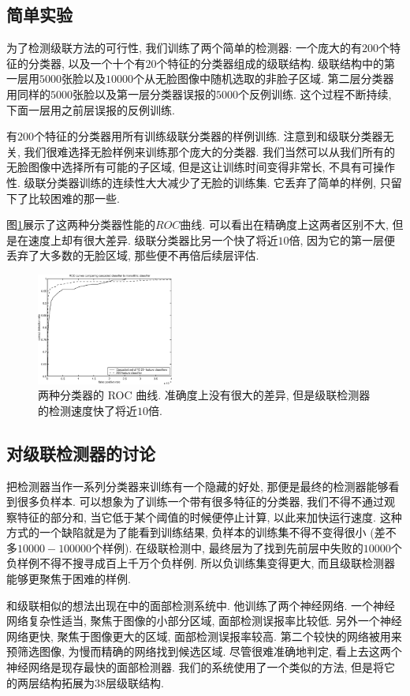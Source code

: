 \documentclass[a4paper,utf8,11pt, onecolumn]{ctexart}
\begin{document}
\subsection{简单实验}
为了检测级联方法的可行性, 我们训练了两个简单的检测器: 一个庞大的有$200$个特征的分类器, 以及一个十个有$20$个特征的分类器组成的级联结构. 级联结构中的第一层用$5000$张脸以及$10000$个从无脸图像中随机选取的非脸子区域.
第二层分类器用同样的$5000$张脸以及第一层分类器误报的$5000$个反例训练. 这个过程不断持续, 下面一层用之前层误报的反例训练.

有$200$个特征的分类器用所有训练级联分类器的样例训练. 注意到和级联分类器无关, 我们很难选择无脸样例来训练那个庞大的分类器. 我们当然可以从我们所有的无脸图像中选择所有可能的子区域, 但是这让训练时间变得非常长, 不具有可操作性. 级联分类器训练的连续性大大减少了无脸的训练集. 它丢弃了简单的样例, 只留下了比较困难的那一些.

图\ref{fig:comp}展示了这两种分类器性能的$ROC$曲线. 可以看出在精确度上这两者区别不大, 但是在速度上却有很大差异. 级联分类器比另一个快了将近$10$倍, 因为它的第一层便丢弃了大多数的无脸区域, 那些便不再倍后续层评估.
\begin{figure}
\centering
\includegraphics[width=0.4\textwidth]{ROC.png}
\caption{两种分类器的 ROC 曲线. 准确度上没有很大的差异, 但是级联检测器的检测速度快了将近$10$倍.}
\label{fig:comp}
\end{figure}
\subsection{对级联检测器的讨论}
把检测器当作一系列分类器来训练有一个隐藏的好处, 那便是最终的检测器能够看到很多负样本. 可以想象为了训练一个带有很多特征的分类器, 我们不得不通过观察特征的部分和, 当它低于某个阈值的时候便停止计算, 以此来加快运行速度. 这种方式的一个缺陷就是为了能看到训练结果, 负样本的训练集不得不变得很小 (差不多$10000-100000$个样例).
在级联检测中, 最终层为了找到先前层中失败的$10000$个负样例不得不搜寻成百上千万个负样例. 所以负训练集变得更大, 而且级联检测器能够更聚焦于困难的样例.

和级联相似的想法出现在\citet{rowley1998neural}中的面部检测系统中. 他训练了两个神经网络. 一个神经网络复杂性适当, 聚焦于图像的小部分区域, 面部检测误报率比较低. 另外一个神经网络更快, 聚焦于图像更大的区域, 面部检测误报率较高. 第二个较快的网络被用来预筛选图像, 为慢而精确的网络找到候选区域.
尽管很难准确地判定, 看上去这两个神经网络是现存最快的面部检测器. 我们的系统使用了一个类似的方法, 但是将它的两层结构拓展为$38$层级联结构.
\end{document}
